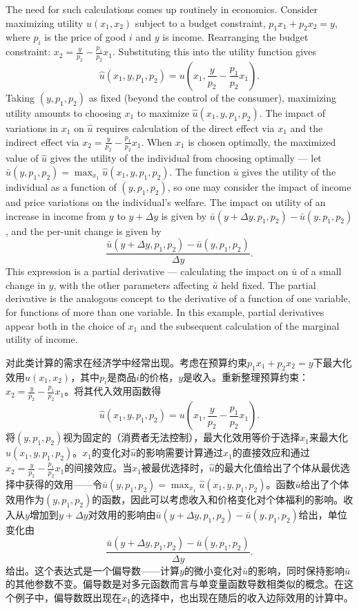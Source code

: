 \begin{original}
The need for such calculations comes up routinely in economics. Consider maximizing utility $u(x_1, x_2)$ subject to a budget constraint, $p_1 x_1 + p_2 x_2 = y$, where $p_i$ is the price of good $i$ and $y$ is income. Rearranging the budget constraint: $x_2 = \frac{y}{p_2} - \frac{p_1}{p_2} x_1$. Substituting this into the utility function gives
\[
\hat{u}(x_1, y, p_1, p_2) = u\!\left(x_1, \frac{y}{p_2} - \frac{p_1}{p_2} x_1\right).
\]
Taking $(y, p_1, p_2)$ as fixed (beyond the control of the consumer), maximizing utility amounts to choosing $x_1$ to maximize $\hat{u}(x_1, y, p_1, p_2)$. The impact of variations in $x_1$ on $\hat{u}$ requires calculation of the direct effect via $x_1$ and the indirect effect via $x_2 = \frac{y}{p_2} - \frac{p_1}{p_2} x_1$. When $x_1$ is chosen optimally, the maximized value of $\hat{u}$ gives the utility of the individual from choosing optimally --- let $\bar{u}(y, p_1, p_2) = \max_{x_1} \hat{u}(x_1, y, p_1, p_2)$. The function $\bar{u}$ gives the utility of the individual as a function of $(y, p_1, p_2)$, so one may consider the impact of income and price variations on the individual's welfare. The impact on utility of an increase in income from $y$ to $y + \Delta y$ is given by $\bar{u}(y + \Delta y, p_1, p_2) - \bar{u}(y, p_1, p_2)$, and the per-unit change is given by
\[
\frac{\bar{u}(y + \Delta y, p_1, p_2) - \bar{u}(y, p_1, p_2)}{\Delta y}.
\]
This expression is a partial derivative --- calculating the impact on $\bar{u}$ of a small change in $y$, with the other parameters affecting $\bar{u}$ held fixed. The partial derivative is the analogous concept to the derivative of a function of one variable, for functions of more than one variable. In this example, partial derivatives appear both in the choice of $x_1$ and the subsequent calculation of the marginal utility of income.
\end{original}
\begin{translation}
对此类计算的需求在经济学中经常出现。考虑在预算约束$p_1 x_1 + p_2 x_2 = y$下最大化效用$u(x_1, x_2)$，其中$p_i$是商品$i$的价格，$y$是收入。重新整理预算约束：$x_2 = \frac{y}{p_2} - \frac{p_1}{p_2} x_1$。将其代入效用函数得
\[
\hat{u}(x_1, y, p_1, p_2) = u\!\left(x_1, \frac{y}{p_2} - \frac{p_1}{p_2} x_1\right).
\]
将$(y, p_1, p_2)$视为固定的（消费者无法控制），最大化效用等价于选择$x_1$来最大化$\hat{u}(x_1, y, p_1, p_2)$。$x_1$的变化对$\hat{u}$的影响需要计算通过$x_1$的直接效应和通过$x_2 = \frac{y}{p_2} - \frac{p_1}{p_2} x_1$的间接效应。当$x_1$被最优选择时，$\hat{u}$的最大化值给出了个体从最优选择中获得的效用——令$\bar{u}(y, p_1, p_2) = \max_{x_1} \hat{u}(x_1, y, p_1, p_2)$。函数$\bar{u}$给出了个体效用作为$(y, p_1, p_2)$的函数，因此可以考虑收入和价格变化对个体福利的影响。收入从$y$增加到$y + \Delta y$对效用的影响由$\bar{u}(y + \Delta y, p_1, p_2) - \bar{u}(y, p_1, p_2)$给出，单位变化由
\[
\frac{\bar{u}(y + \Delta y, p_1, p_2) - \bar{u}(y, p_1, p_2)}{\Delta y}.
\]
给出。这个表达式是一个偏导数——计算$y$的微小变化对$\bar{u}$的影响，同时保持影响$\bar{u}$的其他参数不变。偏导数是对多元函数而言与单变量函数导数相类似的概念。在这个例子中，偏导数既出现在$x_1$的选择中，也出现在随后的收入边际效用的计算中。
\end{translation}

